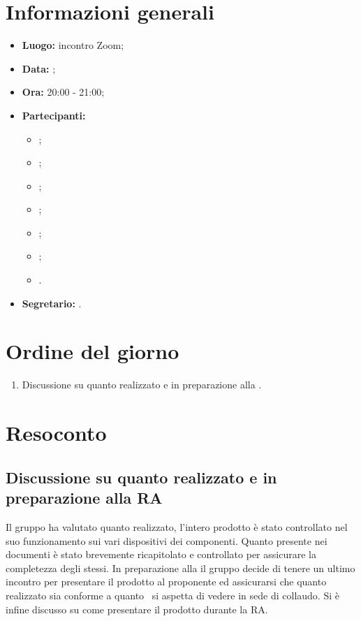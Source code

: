 \section{Informazioni generali}
\begin{itemize}
	\item \textbf{Luogo:} incontro Zoom;
	\item \textbf{Data:} \Data;
	\item \textbf{Ora:} 20:00 - 21:00;
	\item \textbf{Partecipanti:}
	\begin{itemize}
		\item \BL{}; 
		\item \FF{};
		\item \MM{}; 
		\item \PC{};
		\item \TG{};
		\item \TL{};
		\item \VD{}.
	\end{itemize} 
	\item \textbf{Segretario:} \FF{}.
\end{itemize}

\section{Ordine del giorno}
\begin{enumerate}
	\item Discussione su quanto realizzato e in preparazione alla .
\end{enumerate}

\section{Resoconto}
\subsection{Discussione su quanto realizzato e in preparazione alla RA}
Il gruppo ha valutato quanto realizzato, l'intero prodotto è stato controllato nel suo funzionamento sui vari dispositivi dei componenti. Quanto presente nei documenti è stato brevemente ricapitolato e controllato per assicurare la completezza degli stessi. In preparazione alla  il gruppo decide di tenere un ultimo incontro per presentare il prodotto al proponente ed assicurarsi che quanto realizzato sia conforme a quanto \Proponente\ si aspetta di vedere in sede di collaudo. Si è infine discusso su come presentare il prodotto durante la RA. 


